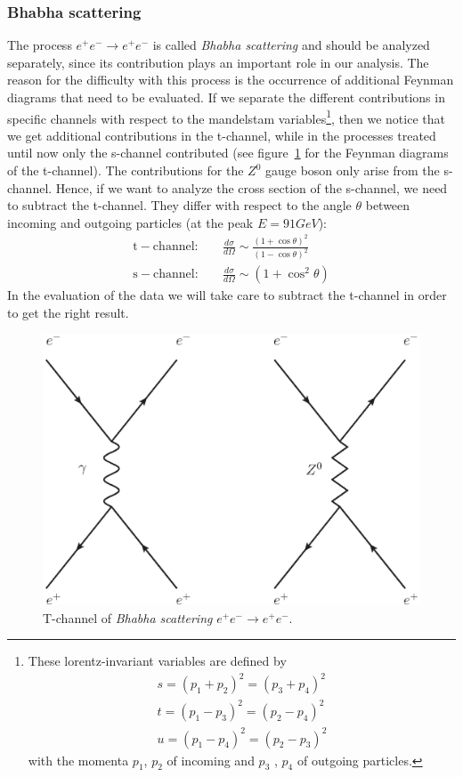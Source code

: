 \subsubsection{Bhabha scattering}
\label{sub:bhabha}
The process $e^+e^-\rightarrow e^+ e^-$ is called \textit{Bhabha scattering} and should be analyzed separately, since its
contribution plays an important role in our analysis. The reason for the difficulty with this process
is the occurrence of additional Feynman diagrams that need to be evaluated. If we separate the different contributions in specific  
channels with respect to the mandelstam variables\footnote{These lorentz-invariant variables are defined by 
\begin{align*}
s=(p_1+p_2)^2=(p_3+p_4)^2 \\
t=(p_1-p_3)^2=(p_2-p_4)^2 \\
u=(p_1-p_4)^2=(p_2-p_3)^2
\end{align*}
with the momenta $p_1$, $p_2$ of incoming and $p_3$ , $p_4$ of outgoing particles.
}, 
then we notice that we get additional contributions in the
t-channel, while in the processes treated until now only the s-channel contributed (see figure~\ref{fig:bhabha} for the
Feynman diagrams of the t-channel). The contributions for the $Z^0$ gauge boson only arise from the s-channel. Hence, if we
want to analyze the cross section of the s-channel, we need to subtract the t-channel. They differ with respect to the
angle $\theta$ between incoming and outgoing particles (at the peak $E=91GeV$):\cite{ver}
\begin{align} 
  \mathrm{t-channel:}\quad    &\frac{d\sigma}{d\Omega} \sim \frac{(1+\cos\theta)^2}{(1-\cos \theta)^2}\\
  \mathrm{s-channel:}\quad    &\frac{d\sigma}{d\Omega} \sim (1+\cos^2\theta)
\end{align}
In the evaluation of the data we will take care to subtract the t-channel in order to get the right result.

\begin{figure}[htpb]
    \centering
    \includegraphics[width=0.6\linewidth]{figures/bhabha}
    \caption{T-channel of \textit{Bhabha scattering} $e^+e^-\rightarrow e^+ e^-$.}
    \label{fig:bhabha}
\end{figure}

